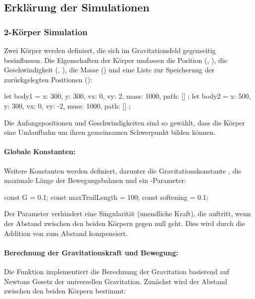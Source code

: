 \documentclass[a4paper,12pt,twoside]{article}
\begin{document}
\subsection{Erklärung der Simulationen}
\subsubsection{2-Körper Simulation}
Zwei Körper werden definiert, die sich im Gravitationsfeld gegenseitig beeinflussen. Die Eigenschaften der Körper umfassen die Position (, ), die Geschwindigkeit (, ), die Masse () und eine Liste zur Speicherung der zurückgelegten Positionen ():

\begin{javascript}
let body1 = { x: 300, y: 300, vx: 0, vy: 2, mass: 1000, path: [] };
let body2 = { x: 500, y: 300, vx: 0, vy: -2, mass: 1000, path: [] };
\end{javascript}

Die Anfangspositionen und Geschwindigkeiten sind so gewählt, dass die Körper eine Umlaufbahn um ihren gemeinsamen Schwerpunkt bilden können.

\paragraph{Globale Konstanten:}
Weitere Konstanten werden definiert, darunter die Gravitationskonstante , die maximale Länge der Bewegungsbahnen und ein -Parameter:

\begin{javascript}
const G = 0.1;
const maxTrailLength = 100;
const softening = 0.1;
\end{javascript}

Der Parameter  verhindert eine Singularität (unendliche Kraft), die auftritt, wenn der Abstand zwischen den beiden Körpern gegen null geht. Dies wird durch die Addition von  zum Abstand kompensiert.

\paragraph{Berechnung der Gravitationskraft und Bewegung:}
Die Funktion  implementiert die Berechnung der Gravitation basierend auf Newtons Gesetz der universellen Gravitation. Zunächst wird der Abstand zwischen den beiden Körpern bestimmt:
\end{document}
